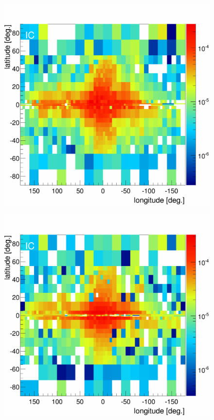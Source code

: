 \begin{figure}[h]
  \centering
  \begin{minipage}[h]{0.3\textwidth}
  	\centering
	\includegraphics[width=1.\linewidth]{pic/discussion/MCRonly_IC_integral_flux.png}
  	\label{}
  \end{minipage}
  \hfill
  \begin{minipage}[h]{0.3\textwidth}
	  \centering
	  \includegraphics[width=1.\linewidth]{pic/discussion/DMonly_IC_integral_flux.png}

\end{minipage}
\end{figure}

